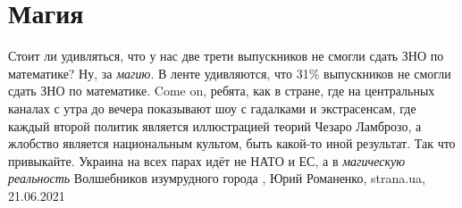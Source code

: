 
 
 
 
 
\chapter{Магия}

Стоит ли удивляться, что у нас две трети выпускников не смогли сдать ЗНО по
математике?  Ну, за \emph{магию}.  В ленте удивляются, что 31\% выпускников не
смогли сдать ЗНО по математике. Come on, ребята, как в стране, где на
центральных каналах с утра до вечера показывают шоу с гадалками и экстрасенсам,
где каждый второй политик является иллюстрацией теорий Чезаро Ламброзо, а
жлобство является национальным культом, быть какой-то иной результат.  Так что
привыкайте. Украина на всех парах идёт не НАТО и ЕС, а в \emph{магическую
реальность} Волшебников изумрудного города
, 
Юрий Романенко, strana.ua, 21.06.2021
